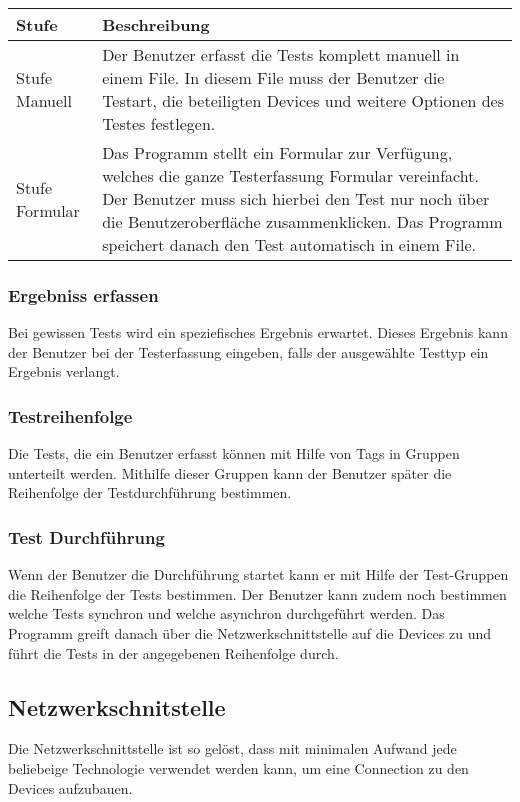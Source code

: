 \documentclass[
	ngerman,
	toc=listof, %
	toc=bibliography, %
	footnotes=multiple, %
	parskip=half, %
	numbers=noendperiod %
]{scrartcl}
\begin{document}
			\begin{tabularx}{\textwidth}{lX}
				\toprule
				Stufe & Beschreibung\\
				\midrule
				Stufe Manuell & Der Benutzer erfasst die Tests komplett manuell in einem File. In diesem File muss der Benutzer die Testart, die beteiligten Devices und weitere Optionen des Testes festlegen. \\
				\midrule
				Stufe Formular & Das Programm stellt ein Formular zur Verfügung, welches die ganze Testerfassung Formular vereinfacht. Der Benutzer muss sich hierbei den Test nur noch über die Benutzeroberfläche zusammenklicken. Das Programm speichert danach den Test automatisch in einem File. \\
				\bottomrule
			\end{tabularx}

		\subsubsection{Ergebniss erfassen}
			Bei gewissen Tests wird ein speziefisches Ergebnis erwartet. Dieses Ergebnis kann der Benutzer bei der Testerfassung eingeben, falls der ausgewählte Testtyp ein Ergebnis verlangt.

		\subsubsection{Testreihenfolge}
			Die Tests, die ein Benutzer erfasst können mit Hilfe von Tags in Gruppen unterteilt werden. Mithilfe dieser Gruppen kann der Benutzer später die Reihenfolge der Testdurchführung bestimmen.
	

		\subsubsection{Test Durchführung}
			Wenn der Benutzer die Durchführung startet kann er mit Hilfe der Test-Gruppen die Reihenfolge der Tests bestimmen. Der Benutzer kann zudem noch bestimmen welche Tests synchron und welche asynchron durchgeführt werden.
			Das Programm greift danach über die Netzwerkschnittstelle auf die Devices zu und führt die Tests in der angegebenen Reihenfolge durch.

	\subsection{Netzwerkschnitstelle}
		Die Netzwerkschnittstelle ist so gelöst, dass mit minimalen Aufwand jede beliebeige Technologie verwendet werden kann, um eine Connection zu den Devices aufzubauen.
\end{document}
